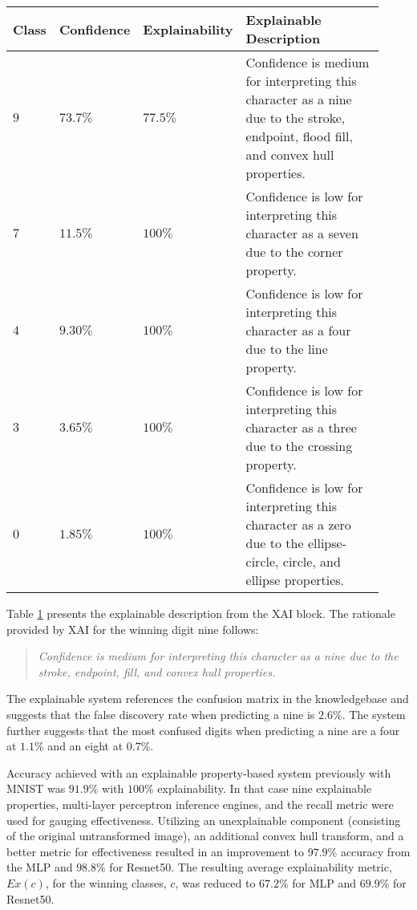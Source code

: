 \begin{table}[H]
    \renewcommand{\arraystretch}{1.3}
     \label{table:mnist_example3_explanation}
    \begin{center}
    \begin{tabular}{| m{0.06\linewidth} | m{0.14\linewidth} | m{0.17\linewidth} | m{0.55\linewidth} |}
    \hline
     Class & Confidence & Explainability & Explainable Description \\
    \hline \hline
    $9$ & $73.7\%$ & $77.5\%$ & Confidence is medium for interpreting this character as a nine due to the stroke, endpoint, flood fill, and convex hull properties. \\ 
    \hline
    $7$ & $11.5\%$ & $100\%$ & Confidence is low for interpreting this character as a seven due to the corner property. \\
    \hline
    $4$ & $9.30\%$ & $100\%$ & Confidence is low for interpreting this character as a four due to the line property. \\
    \hline
    $3$ & $3.65\%$ & $100\%$ & Confidence is low for interpreting this character as a three due to the crossing property. \\
    \hline
    $0$ & $1.85\%$ & $100\%$ & Confidence is low for interpreting this character as a zero due to the ellipse-circle, circle, and ellipse properties. \\
    \hline
    \end{tabular}
    \end{center}
\end{table}

Table \ref{table:mnist_example3_explanation} presents the explainable description from the
XAI block.  The rationale provided by XAI for the winning digit nine follows:

\begin{quote}
    \textit{Confidence is medium for interpreting this character as a nine due to the stroke, endpoint, fill, and convex hull properties.}
\end{quote}

The explainable system references the confusion matrix in the knowledgebase and
suggests that the false discovery rate when predicting a nine is $2.6\%$. The
system further suggests that the most confused digits when predicting a nine are
a four at $1.1\%$ and an eight at $0.7\%$.

Accuracy achieved with an explainable property-based system previously with
MNIST was $91.9\%$ with $100\%$ explainability\cite{whitten21}.  In that case
nine explainable properties, multi-layer perceptron inference engines, and the
recall metric were used for gauging effectiveness. Utilizing an unexplainable
component (consisting of the original untransformed image), an additional convex
hull transform, and a better metric for effectiveness resulted in an improvement
to $97.9\%$ accuracy from the MLP and $98.8\%$ for Resnet50. The resulting
average explainability metric, $Ex(c)$, for the winning classes, $c$, was
reduced to $67.2$\% for MLP and $69.9\%$ for Resnet50.

